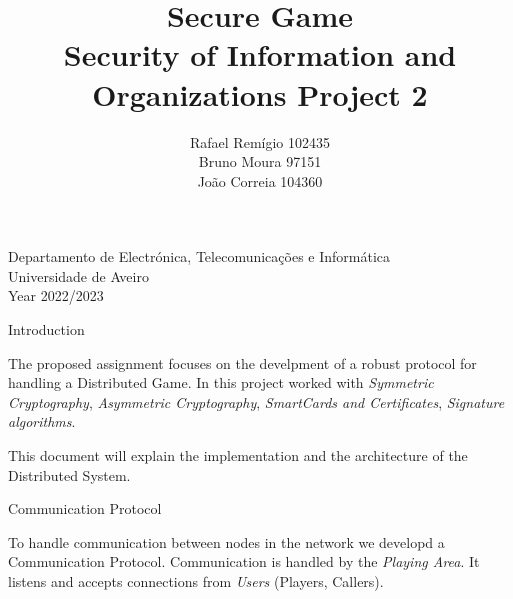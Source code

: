 \documentclass[11pt]{article}
\begin{document}
\begin{titlepage}

\title{%
  Secure Game \\
  \large  Security of Information and Organizations Project 2\\}

\author{Rafael Remígio 102435 \\ Bruno Moura 97151\\ João Correia 104360}

\maketitle

\vfill
\begin{center}

	Departamento de Electrónica, Telecomunicações e Informática\\
       Universidade de Aveiro\\ Year 2022/2023
\end{center}



\end{titlepage}


\begin{center}
	\Huge Introduction
\end{center}


\par The proposed assignment focuses on the develpment of a robust protocol for handling a Distributed Game. In this project worked with \emph{Symmetric Cryptography}, \emph{Asymmetric Cryptography}, \emph{SmartCards and Certificates}, \emph{Signature algorithms}.
\par This document will explain the implementation and the architecture of the Distributed System.

\pagebreak


\begin{center}
	\Huge Communication Protocol
\end{center}

To handle communication between nodes in the network we developd a Communication Protocol. Communication is handled by the \emph{Playing Area}. It listens and accepts connections from \emph{Users} (Players, Callers).
\end{document}
